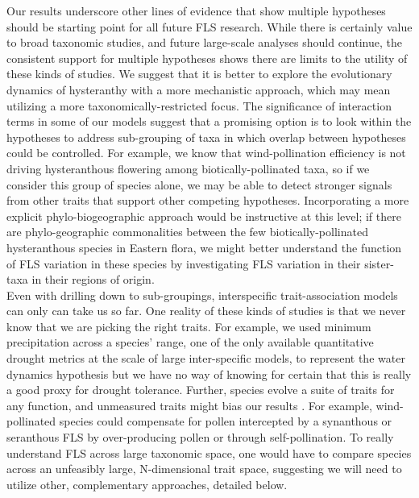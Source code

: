 \documentclass[12pt]{article}
\begin{document}
\indent\indent Our results underscore other lines of evidence that show multiple hypotheses should be starting point for all future FLS research. While there is certainly value to broad taxonomic studies, and future large-scale analyses should continue, the consistent support for multiple hypotheses shows there are limits to the utility of these kinds of studies. We suggest that it is better to explore the evolutionary dynamics of hysteranthy with a more mechanistic approach, which may mean utilizing a more taxonomically-restricted focus. The significance of interaction terms in some of our models suggest that a promising option is to look within the hypotheses to address sub-grouping of taxa in which overlap between hypotheses could be controlled. For example, we know that wind-pollination efficiency is not driving hysteranthous flowering among biotically-pollinated taxa, so if we consider this group of species alone, we may be able to detect stronger signals from other traits that support other competing hypotheses. Incorporating a more explicit phylo-biogeographic approach would be instructive at this level; if there are phylo-geographic commonalities between the few biotically-pollinated hysteranthous species in Eastern flora, we might better understand the function of FLS variation in these species by investigating FLS variation in their sister-taxa in their regions of origin.\\

\indent Even with drilling down to sub-groupings, interspecific trait-association models can only can take us so far. One reality of these kinds of studies is that we never know that we are picking the right traits. For example, we used minimum precipitation across a species' range, one of the only available quantitative drought metrics at the scale of large inter-specific models, to represent the water dynamics hypothesis but we have no way of knowing for certain that this is really a good proxy for drought tolerance. Further, species evolve a suite of traits for any function, and unmeasured traits might bias our results \citep{Davies2019}. For example, wind-pollinated species could compensate for pollen intercepted by a synanthous or seranthous FLS by over-producing pollen or through self-pollination. To really understand FLS across large taxonomic space, one would have to compare species across an unfeasibly large, N-dimensional trait space, suggesting we will need to utilize other, complementary approaches, detailed below.

\end{document}
